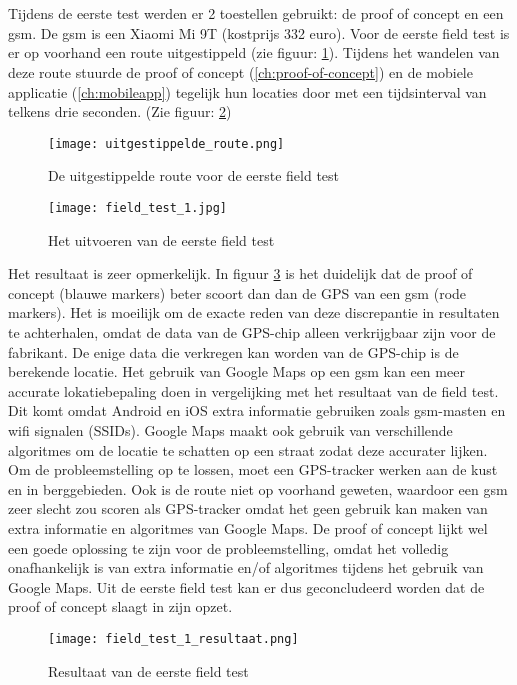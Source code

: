 \section{}
Tijdens de eerste test werden er 2 toestellen gebruikt: de proof of concept en een gsm. De gsm is een Xiaomi Mi 9T (kostprijs 332 euro).
Voor de eerste field test is er op voorhand een route uitgestippeld (zie figuur: \ref{fig:uitgestippelde_route}). Tijdens het wandelen van deze route stuurde de proof of concept (\ref{ch:proof-of-concept}) en de mobiele applicatie (\ref{ch:mobileapp}) tegelijk hun locaties door met een tijdsinterval van telkens drie seconden. (Zie figuur: \ref{fig:field_test_1})
\begin{figure}
	\texttt{[image: uitgestippelde\_route.png]}
	\caption{De uitgestippelde route voor de eerste field test}
	\label{fig:uitgestippelde_route}
\end{figure}
\begin{figure}
	\texttt{[image: field\_test\_1.jpg]}
	\caption{Het uitvoeren van de eerste field test}
	\label{fig:field_test_1}
\end{figure}
\newline
\newline
Het resultaat is zeer opmerkelijk. In figuur \ref{fig:field_test_1_resultaat} is het duidelijk dat de proof of concept (blauwe markers) beter scoort dan dan de GPS van een gsm (rode markers). Het is moeilijk om de exacte reden van deze discrepantie in resultaten te achterhalen, omdat de data van de GPS-chip alleen verkrijgbaar zijn voor de fabrikant. De enige data die verkregen kan worden van de GPS-chip is de berekende locatie. 
\newline
Het gebruik van Google Maps op een gsm kan een meer accurate lokatiebepaling doen in vergelijking met het resultaat van de field test. Dit komt omdat Android en iOS extra informatie gebruiken zoals gsm-masten en wifi signalen (SSIDs). Google Maps maakt ook gebruik van verschillende algoritmes om de locatie te schatten op een straat zodat deze accurater lijken.
\newline
Om de probleemstelling op te lossen, moet een GPS-tracker werken aan de kust en in berggebieden. Ook is de route niet op voorhand geweten, waardoor een gsm zeer slecht zou scoren als GPS-tracker omdat het geen gebruik kan maken van extra informatie en algoritmes van Google Maps. De proof of concept lijkt wel een goede oplossing te zijn voor de probleemstelling, omdat het volledig onafhankelijk is van extra informatie en/of algoritmes tijdens het gebruik van Google Maps. 
\newline
Uit de eerste field test kan er dus geconcludeerd worden dat de proof of concept slaagt in zijn opzet.
\begin{figure}
	\texttt{[image: field\_test\_1\_resultaat.png]}
	\caption{Resultaat van de eerste field test}
	\label{fig:field_test_1_resultaat}
\end{figure}
